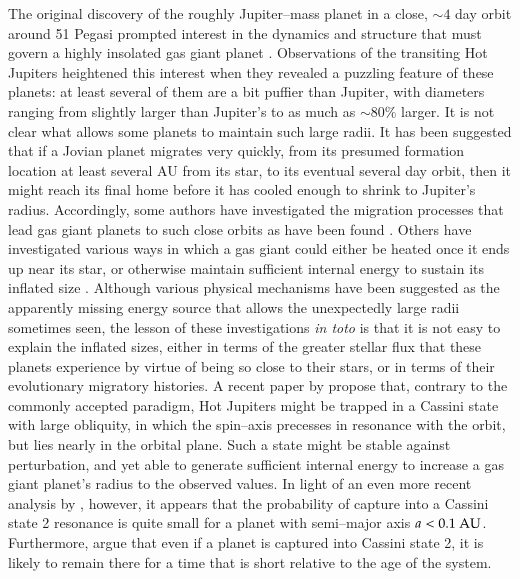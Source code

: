 The original discovery of the roughly Jupiter--mass planet in a close,
$\sim 4$ day orbit around 51 Pegasi \citep{mayor+queloz1995} prompted
interest in the dynamics and structure that must govern a highly
insolated gas giant planet \citep{guillot_et_al1996}.  Observations of
the transiting Hot Jupiters heightened this interest when they
revealed a puzzling feature of these planets: at least several of them
are a bit puffier than Jupiter, with diameters ranging from slightly
larger than Jupiter's to as much as $\sim 80\%$ larger.  It is not
clear what allows some planets to maintain such large radii.  It has
been suggested that if a Jovian planet migrates very quickly, from its
presumed formation location at least several AU from its star, to its
eventual several day orbit, then it might reach its final home before
it has cooled enough to shrink to Jupiter's radius.  Accordingly, some
authors have investigated the migration processes that lead gas giant
planets to such close orbits as have been found
\citep[e.g.][]{trilling_et_al2002}.  Others have investigated various
ways in which a gas giant could either be heated once it ends up near
its star, or otherwise maintain sufficient internal energy to sustain
its inflated size \citep{guillot+showman2002, burrows_et_al2003,
laughlin_et_al2005, bodenheimer_et_al2003, guillot2005,
burrows_et_al2007, chabrier+baraffe2007}.  Although various physical
mechanisms have been suggested as the apparently missing energy source
that allows the unexpectedly large radii sometimes seen, the lesson of
these investigations {\it in toto} is that it is not easy to explain
the inflated sizes, either in terms of the greater stellar flux that
these planets experience by virtue of being so close to their stars,
or in terms of their evolutionary migratory histories.  A recent paper
by \citet{winn+holman2005} propose that, contrary to the commonly
accepted paradigm, Hot Jupiters might be trapped in a Cassini state
with large obliquity, in which the spin--axis precesses in resonance
with the orbit, but lies nearly in the orbital plane.  Such a state
might be stable against perturbation, and yet able to generate
sufficient internal energy to increase a gas giant planet's radius to
the observed values.  In light of an even more recent analysis by
\citet{levrard_et_al2007}, however, it appears that the probability of
capture into a Cassini state 2 resonance is quite small for a planet
with semi--major axis $a < 0.1 {\rm ~AU}$.  Furthermore,
\citet{fabrycky_et_al2007} argue that even if a planet is captured
into Cassini state 2, it is likely to remain there for a time that is
short relative to the age of the system.

